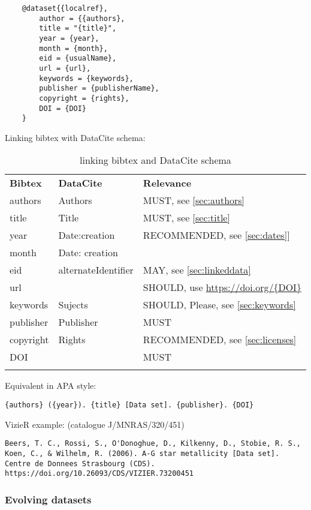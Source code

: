 \documentclass[11pt,a4paper]{ivoa}
\begin{document}
\begin{lstlisting}
	@dataset{{localref},
		author = {{authors},
		title = "{title}",
		year = {year},
		month = {month},
		eid = {usualName},
		url = {url},
		keywords = {keywords},
		publisher = {publisherName},
		copyright = {rights},
		DOI = {DOI}
	}
\end{lstlisting}

Linking bibtex with DataCite schema:\\

\begin{table}[th]
	\begin{tabular}{lll}
		\sptablerule
		\textbf{Bibtex} & \textbf{DataCite} & \textbf{Relevance} \\
		\sptablerule
		\sptablerule
	authors & Authors & MUST, see \ref{sec:authors} \\
	title & Title & MUST, see \ref{sec:title}\\
	year &  Date:creation & RECOMMENDED, see \ref{sec:dates}] \\
	month & Date: creation & \\
	eid & alternateIdentifier & MAY, see \ref{sec:linkeddata}\\
	url & & SHOULD, use \url{https://doi.org/{DOI}} \\
	keywords & Sujects & SHOULD, Please, see \ref{sec:keywords} \\
	publisher & Publisher & MUST \\
    copyright & Rights & RECOMMENDED, see \ref{sec:licenses} \\
    DOI & & MUST \\
    \sptablerule
	\end{tabular}%
\caption{\label{tab:astroDOIs1}linking bibtex and DataCite schema}
\end{table}

Equivalent in APA style:
\begin{verbatim}
{authors} ({year}). {title} [Data set]. {publisher}. {DOI}
\end{verbatim}

VizieR example: (catalogue J/MNRAS/320/451)
\begin{verbatim}
Beers, T. C., Rossi, S., O'Donoghue, D., Kilkenny, D., Stobie, R. S.,
Koen, C., & Wilhelm, R. (2006). A-G star metallicity [Data set]. 
Centre de Donnees Strasbourg (CDS). https://doi.org/10.26093/CDS/VIZIER.73200451
\end{verbatim}

\subsubsection{Evolving datasets}
\end{document}
